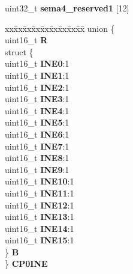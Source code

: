 \begin{DoxyCompactItemize}
\begin{tabbing}
\end{tabbing}\item 
\mbox{\label{structSEMA4__tag_afa1a306d4f6e460df2ac9fd0e8e4d5fa}} 
uint32\+\_\+t {\bfseries sema4\+\_\+reserved1} \mbox{[}12\mbox{]}
\item 
\mbox{\label{structSEMA4__tag_aa37b7256bcf9d031bbed8eaf7acc298a}} 
\begin{tabbing}
xx\=xx\=xx\=xx\=xx\=xx\=xx\=xx\=xx\=\kill
union \{\\
\>uint16\_t {\bfseries R}\\
\>struct \{\\
\>\>uint16\_t {\bfseries INE0}:1\\
\>\>uint16\_t {\bfseries INE1}:1\\
\>\>uint16\_t {\bfseries INE2}:1\\
\>\>uint16\_t {\bfseries INE3}:1\\
\>\>uint16\_t {\bfseries INE4}:1\\
\>\>uint16\_t {\bfseries INE5}:1\\
\>\>uint16\_t {\bfseries INE6}:1\\
\>\>uint16\_t {\bfseries INE7}:1\\
\>\>uint16\_t {\bfseries INE8}:1\\
\>\>uint16\_t {\bfseries INE9}:1\\
\>\>uint16\_t {\bfseries INE10}:1\\
\>\>uint16\_t {\bfseries INE11}:1\\
\>\>uint16\_t {\bfseries INE12}:1\\
\>\>uint16\_t {\bfseries INE13}:1\\
\>\>uint16\_t {\bfseries INE14}:1\\
\>\>uint16\_t {\bfseries INE15}:1\\
\>\} {\bfseries B}\\
\} {\bfseries CP0INE}\\


\end{tabbing}
\end{DoxyCompactItemize}
